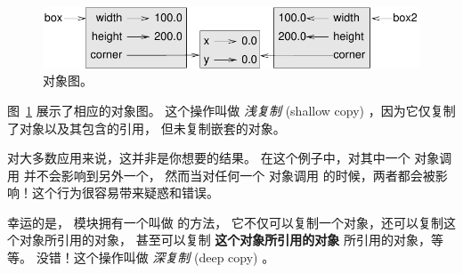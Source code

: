 \begin{figure}
\centerline
{\includegraphics[scale=0.8]{../source/figs/rectangle2.pdf}}
\caption{对象图。}
\label{fig.rectangle2}
\end{figure}


图~\ref{fig.rectangle2} 展示了相应的对象图。 这个操作叫做 {\em 浅复制} (shallow
copy) ，因为它仅复制了对象以及其包含的引用， 但未复制嵌套的对象。
  
  
  


对大多数应用来说，这并非是你想要的结果。
在这个例子中，对其中一个  对象调用 并不会影响到另外一个， 然而当对任何一个  对象调用 的时候，两者都会被影响！这个行为很容易带来疑惑和错误。
  


幸运的是，  模块拥有一个叫做  的方法，
它不仅可以复制一个对象，还可以复制这个对象所引用的对象，
甚至可以复制 {\bf 这个对象所引用的对象} 所引用的对象，等等。
没错！这个操作叫做 {\em 深复制} (deep copy) 。

  

